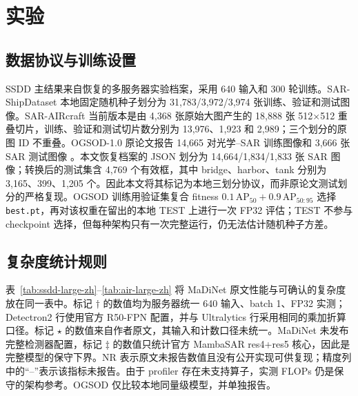 \documentclass[10pt,twocolumn]{ctexart}
\begin{document}
\section{实验}

\subsection{数据协议与训练设置}

SSDD 主结果来自恢复的多服务器实验档案，采用 640 输入和 300 轮训练。SAR-ShipDataset 本地固定随机种子划分为 31,783/3,972/3,974 张训练、验证和测试图像。SAR-AIRcraft 当前版本是由 4,368 张原始大图产生的 18,888 张 512$\times$512 重叠切片，训练、验证和测试切片数分别为 13,976、1,923 和 2,989；三个划分的原图 ID 不重叠。OGSOD-1.0 原论文报告 14,665 对光学--SAR 训练图像和 3,666 张 SAR 测试图像 \citep{ogsod}。本文恢复档案的 JSON 划分为 14,664/1,834/1,833 张 SAR 图像；转换后的测试集含 4,769 个有效框，其中 bridge、harbor、tank 分别为 3,165、399、1,205 个。因此本文将其标记为本地三划分协议，而非原论文测试划分的严格复现。OGSOD 训练用验证集复合 fitness $0.1\,\mathrm{AP}_{50}+0.9\,\mathrm{AP}_{50:95}$ 选择 \texttt{best.pt}，再对该权重在留出的本地 TEST 上进行一次 FP32 评估；TEST 不参与 checkpoint 选择，但每种架构只有一次完整运行，仍无法估计随机种子方差。

\begin{table}[t]
\centering
\small
\caption{代表性训练设置。}
\end{table}
\subsection{复杂度统计规则}

表~\ref{tab:ssdd-large-zh}--\ref{tab:air-large-zh} 将 MaDiNet 原文性能与可确认的复杂度放在同一表中。标记 $\dagger$ 的数值均为服务器统一 640 输入、batch 1、FP32 实测；Detectron2 行使用官方 R50-FPN 配置，并与 Ultralytics 行采用相同的乘加折算口径。标记 $\star$ 的数值来自作者原文，其输入和计数口径未统一。MaDiNet 未发布完整检测器配置，标记 $\ddagger$ 的数值只统计官方 MambaSAR res4+res5 核心，因此是完整模型的保守下界。NR 表示原文未报告数值且没有公开实现可供复现；精度列中的“--”表示该指标未报告。由于 profiler 存在未支持算子，实测 FLOPs 仍是保守的架构参考。OGSOD 仅比较本地同量级模型，并单独报告。
\end{document}
